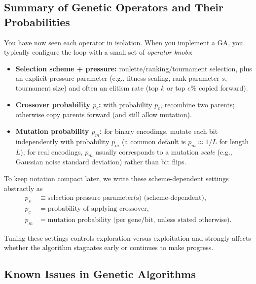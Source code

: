\subsection{Summary of Genetic Operators and Their Probabilities}
\label{sec:evo_summary_of_genetic_operators_and_their_probabilities}

You have now seen each operator in isolation. When you implement a GA, you typically configure the loop with a small set of \emph{operator knobs}:
\begin{itemize}
    \item \textbf{Selection scheme + pressure:} roulette/ranking/tournament selection, plus an explicit pressure parameter (e.g., fitness scaling, rank parameter \(s\), tournament size) and often an elitism rate (top \(k\) or top \(e\%\) copied forward).
    \item \textbf{Crossover probability \(p_c\):} with probability \(p_c\), recombine two parents; otherwise copy parents forward (and still allow mutation).
    \item \textbf{Mutation probability \(p_m\):} for binary encodings, mutate each bit independently with probability \(p_m\) (a common default is \(p_m \approx 1/L\) for length \(L\)); for real encodings, \(p_m\) usually corresponds to a mutation \emph{scale} (e.g., Gaussian noise standard deviation) rather than bit flips.
\end{itemize}

To keep notation compact later, we write these scheme-dependent settings abstractly as
\[
\begin{aligned}
p_s &\equiv \text{selection pressure parameter(s) (scheme-dependent)},\\
p_c &= \text{probability of applying crossover},\\
p_m &= \text{mutation probability (per gene/bit, unless stated otherwise)}.
\end{aligned}
\]

Tuning these settings controls exploration versus exploitation and strongly affects whether the algorithm stagnates early or continues to make progress.


\subsection{Known Issues in Genetic Algorithms}
\label{sec:evo_known_issues_in_genetic_algorithms}

